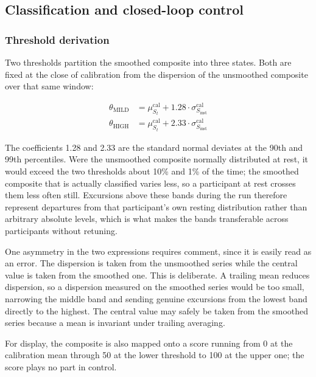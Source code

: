 \subsection{Classification and closed-loop control}
\label{sec:control}

\subsubsection{Threshold derivation}
\label{sec:thresholds}

Two thresholds partition the smoothed composite into three
states. Both are fixed at the close of calibration from the
dispersion of the unsmoothed composite over that same window:

\begin{align}
\theta_{\mathrm{MILD}} &= \mu_{S_{t}}^{\mathrm{cal}}
+ 1.28 \cdot \sigma_{S_{\mathrm{inst}}}^{\mathrm{cal}} \\[2pt]
\theta_{\mathrm{HIGH}} &= \mu_{S_{t}}^{\mathrm{cal}}
+ 2.33 \cdot \sigma_{S_{\mathrm{inst}}}^{\mathrm{cal}}
\end{align}

The coefficients 1.28 and 2.33 are the standard normal deviates
at the 90th and 99th percentiles. Were the unsmoothed composite
normally distributed at rest, it would exceed the two thresholds
about 10\% and 1\% of the time; the smoothed composite that is
actually classified varies less, so a participant at rest crosses
them less often still. Excursions above these bands during the
run therefore represent departures from that participant's own
resting distribution rather than arbitrary absolute levels, which
is what makes the bands transferable across participants without
retuning.

One asymmetry in the two expressions requires comment, since it
is easily read as an error. The dispersion is taken from the
unsmoothed series while the central value is taken from the
smoothed one. This is deliberate. A trailing mean reduces
dispersion, so a dispersion measured on the smoothed series would
be too small, narrowing the middle band and sending genuine
excursions from the lowest band directly to the highest. The central value may safely be taken
from the smoothed series because a mean is invariant under
trailing averaging.

For display, the composite is also mapped onto a score running
from 0 at the calibration mean through 50 at the lower threshold
to 100 at the upper one; the score plays no part in control.

